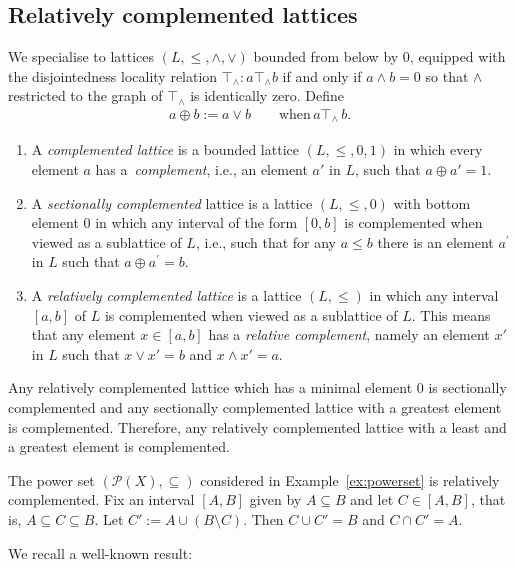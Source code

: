 \documentclass[10pt,a4paper]{amsart}
\numberwithin{equation}{section}
\newcommand{\loc}{locality\xspace}
\begin{document}
\subsection{Relatively complemented lattices}

We specialise to lattices {$(L, \leq, \wedge, \vee)$} bounded from below by $0$, equipped with the disjointedness \loc relation $\top_\wedge\colon a\top_\wedge b$ if and only if $a\wedge b=0$
so that $\wedge$ restricted to the graph of $\top_\wedge$ is identically zero.
Define
	\begin{gather*}%
	a\oplus b:=a \vee b \qquad \text{when}\, {a\top_\wedge}\,b.
\end{gather*}


\begin{Definition}\label{defn:relcomplt}\qquad
\begin{enumerate}\itemsep=0pt
\item[$(a)$] A {\it complemented lattice} is a bounded lattice $(L,\leq, 0, 1)$ in which every element $a$ has a~{\it complement}, i.e., an element $a'$ in $ L$, such that $a \oplus a' = 1$.
\item[$(b)$]
A {\it sectionally complemented } lattice 	
is a lattice $(L,\leq, 0)$ with bottom element $0$ in which any interval of the form $[0, b]$ is complemented when viewed as a sublattice of $L$, i.e., such that for any $a\le b$ there is an element $a^\prime$ in $ L$ such that $a \oplus a^\prime = b$.
\item[$(c)$] A {\it relatively complemented lattice} is a lattice $(L,\leq)$ in which any interval $[a, b]$ of $L$ is complemented when viewed as a sublattice of $L$. This means that any element $x\in [a, b]$ has a {\it relative complement}, namely an element $x'$ in $ L$ such that $x \vee x' = b$ and $x\wedge x'=a$.
\end{enumerate}
\end{Definition}

\begin{Remark}
Any relatively complemented lattice which has a minimal element $0$ is sectionally complemented and any sectionally complemented lattice with a greatest element is complemented. Therefore, any relatively complemented lattice with a least and a greatest element is complemented.
\end{Remark}

\begin{Example} 	The power set $\left({\mathcal P}(X), \subseteq \right)$ considered in Example~\ref{ex:powerset} is relatively complemented. Fix an interval $[A,B]$ given by $A\subseteq B$ and let $C\in [A,B]$, that is, $A\subseteq C \subseteq B$. Let $C':=A\cup (B\setminus C)$. Then $C\cup C'=B$ and $C\cap C'=A$.
	\end{Example}
We recall a well-known result:
\end{document}
